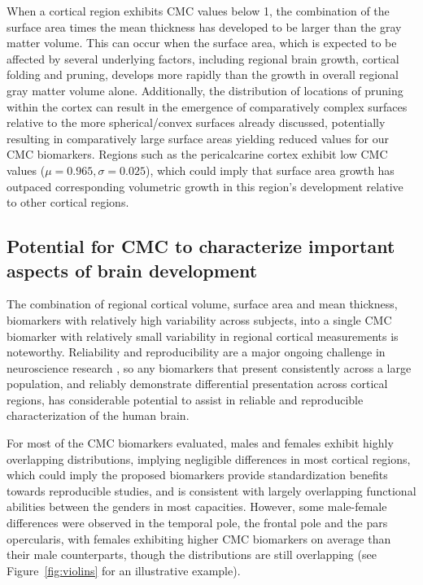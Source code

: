 \documentclass{article}
\begin{document}
When a cortical region exhibits CMC values below 1, the combination of the
surface area times the mean thickness has developed to be larger than the
gray matter volume. This can occur when the surface area, which is expected
to be affected by several underlying factors, including regional brain
growth, cortical folding and pruning, develops more rapidly than the growth
in overall regional gray matter volume alone. Additionally, the distribution
of locations of pruning within the cortex can result in the emergence of
comparatively complex surfaces relative to the more spherical/convex surfaces
already discussed, potentially resulting in comparatively large surface areas
yielding reduced values for our CMC biomarkers. Regions such as the
pericalcarine cortex exhibit low CMC values (\(\mu=0.965, \sigma=0.025\)),
which could imply that surface area growth has outpaced corresponding
volumetric growth in this region's development relative to other cortical
regions.


\subsection{Potential for CMC to characterize important aspects of brain development}

The combination of regional cortical volume, surface area and mean thickness,
biomarkers with relatively high variability across subjects, into a single
CMC biomarker with relatively small variability in regional cortical
measurements is noteworthy. Reliability and reproducibility are a major
ongoing challenge in neuroscience research
\citep{martinezReproducibilityBraincognitionRelationships2015,marekReproducibleBrainwideAssociation2022},
so any biomarkers that present consistently across a large population, and
reliably demonstrate differential presentation across cortical regions, has
considerable potential to assist in reliable and reproducible
characterization of the human brain.

For most of the CMC biomarkers evaluated, males and females exhibit highly
overlapping distributions, implying negligible differences in most cortical
regions, which could imply the proposed biomarkers provide standardization
benefits towards reproducible studies, and is consistent with largely
overlapping functional abilities between the genders in most capacities.
However, some male-female differences were observed in the temporal pole, the
frontal pole and the pars opercularis, with females exhibiting higher CMC
biomarkers on average than their male counterparts, though the distributions
are still overlapping (see Figure~\ref{fig:violins} for an illustrative
example).
\end{document}

